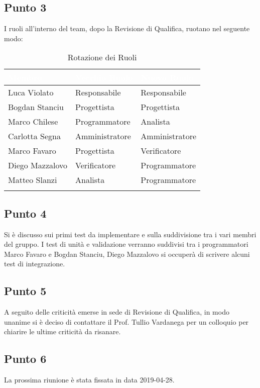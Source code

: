 \subsection{Punto 3}
I ruoli all'interno del team, dopo la Revisione di Qualifica, ruotano nel seguente modo:\\

\begin{center}
	\begin{longtable}[c]{|m{}|m{}|m{}|} 
		\hline
		\rowcolor{bluelogo}\textbf{\textcolor{white}{Membro}} & \textbf{\textcolor{white}{Vecchio Ruolo}} & \textbf{\textcolor{white}{Nuovo Ruolo}}\\
		\hline
		\hline
		Luca Violato & Responsabile & Responsabile \\
		\hline
		\rowcolor{grigio}Bogdan Stanciu & Progettista & Progettista \\
		\hline
		Marco Chilese & Programmatore & Analista\\
		\hline
		\rowcolor{grigio}Carlotta Segna & Amministratore & Amministratore\\
		\hline
		Marco Favaro & Progettista & Verificatore \\
		\hline
		\rowcolor{grigio} Diego Mazzalovo & Verificatore & Programmatore\\
		\hline
		Matteo Slanzi & Analista & Programmatore\\
		\hline
		\caption{Rotazione dei Ruoli}
	\end{longtable}

\end{center}

\subsection{Punto 4}
Si è discusso sui primi test da implementare e sulla suddivisione tra i vari membri del gruppo. 
I test di unità e validazione verranno suddivisi tra i programmatori Marco Favaro e Bogdan Stanciu, Diego Mazzalovo si occuperà di scrivere alcuni test di integrazione.
	
\subsection{Punto 5}
A seguito delle criticità emerse in sede di Revisione di Qualifica, in modo unanime si è deciso di contattare il Prof. Tullio Vardanega per un colloquio per chiarire le ultime criticità da risanare.

\subsection{Punto 6}
La prossima riunione è stata fissata in data 2019-04-28.
